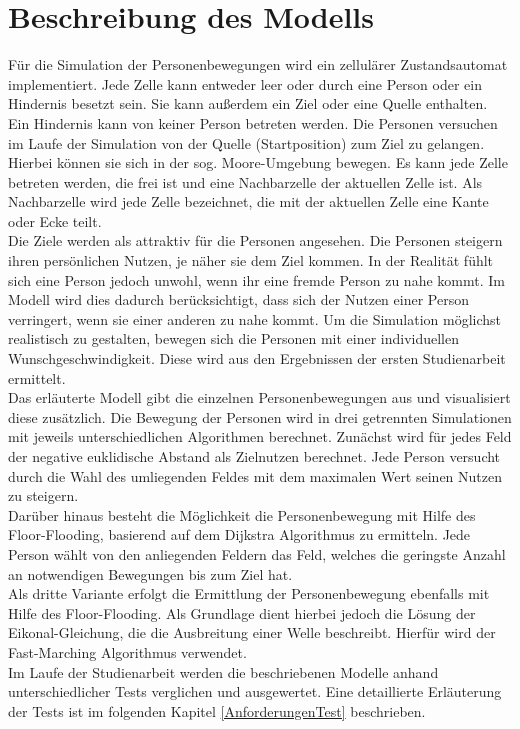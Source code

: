 \section{Beschreibung des Modells}
Für die Simulation der Personenbewegungen wird ein zellulärer Zustandsautomat implementiert. Jede Zelle kann entweder leer oder durch eine Person oder ein Hindernis besetzt sein. Sie kann außerdem ein Ziel oder eine Quelle enthalten. Ein Hindernis kann von keiner Person betreten werden. Die Personen versuchen im Laufe der Simulation von der Quelle (Startposition) zum Ziel zu gelangen. Hierbei können sie sich in der sog. Moore-Umgebung bewegen. Es kann jede Zelle betreten werden, die frei ist und eine Nachbarzelle der aktuellen Zelle ist. Als Nachbarzelle wird jede Zelle bezeichnet, die mit der aktuellen Zelle eine Kante oder Ecke teilt. \\
Die Ziele werden als attraktiv für die Personen angesehen. Die Personen steigern ihren persönlichen Nutzen, je näher sie dem Ziel kommen. In der Realität fühlt sich eine Person jedoch unwohl, wenn ihr eine fremde Person zu nahe kommt. Im Modell wird dies dadurch berücksichtigt, dass sich der Nutzen einer Person verringert, wenn sie einer anderen zu nahe kommt. Um die Simulation möglichst realistisch zu gestalten, bewegen sich die Personen mit einer individuellen Wunschgeschwindigkeit. Diese wird aus den Ergebnissen der ersten Studienarbeit ermittelt. \\
Das erläuterte Modell gibt die einzelnen Personenbewegungen aus und visualisiert diese zusätzlich. Die Bewegung der Personen wird in drei getrennten Simulationen mit jeweils unterschiedlichen Algorithmen berechnet. Zunächst wird für jedes Feld der negative euklidische Abstand als Zielnutzen berechnet. Jede Person versucht durch die Wahl des umliegenden Feldes mit dem maximalen Wert seinen Nutzen zu steigern. \\
Darüber hinaus besteht die Möglichkeit die Personenbewegung mit Hilfe des Floor-Flooding, basierend auf dem Dijkstra Algorithmus zu ermitteln. Jede Person wählt von den anliegenden Feldern das Feld, welches die geringste Anzahl an notwendigen Bewegungen bis zum Ziel hat. \\
Als dritte Variante erfolgt die Ermittlung der Personenbewegung ebenfalls mit Hilfe des Floor-Flooding. Als Grundlage dient hierbei jedoch die Lösung der Eikonal-Gleichung, die die Ausbreitung einer Welle beschreibt. Hierfür wird der Fast-Marching Algorithmus verwendet.  \\
Im Laufe der Studienarbeit werden die beschriebenen Modelle anhand unterschiedlicher Tests verglichen und ausgewertet. Eine detaillierte Erläuterung der Tests ist im folgenden Kapitel \ref{AnforderungenTest} beschrieben.


